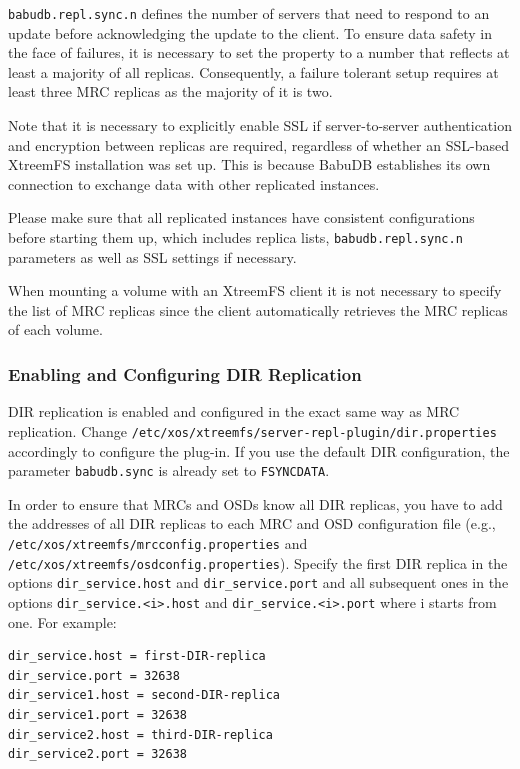 \documentclass[a4paper,10pt]{book}
\begin{document}
\texttt{babudb.repl.sync.n} defines the number of servers that need to respond to an update before acknowledging the update to the client. To ensure data safety in the face of failures, it is necessary to set the property to a number that reflects at least a majority of all replicas. Consequently, a failure tolerant setup requires at least three MRC replicas as the majority of it is two.

Note that it is necessary to explicitly enable SSL if server-to-server authentication and encryption between replicas are required, regardless of whether an SSL-based XtreemFS installation was set up. This is because BabuDB establishes its own connection to exchange data with other replicated instances.

Please make sure that all replicated instances have consistent configurations before starting them up, which includes replica lists, \texttt{babudb.repl.sync.n} parameters as well as SSL settings if necessary.

When mounting a volume with an XtreemFS client it is not necessary to specify the list of MRC replicas since the client automatically retrieves the MRC replicas of each volume.

\subsubsection{Enabling and Configuring DIR Replication}
DIR replication is enabled and configured in the exact same way as MRC replication. Change \texttt{/etc/xos/xtreemfs/server-repl-plugin/dir.properties} accordingly to configure the plug-in. If you use the default DIR configuration, the parameter \texttt{babudb.sync} is already set to \texttt{FSYNCDATA}.

In order to ensure that MRCs and OSDs know all DIR replicas, you have to add the addresses of all DIR replicas to each MRC and OSD configuration file (e.g.,  \texttt{/etc/xos/xtreemfs/mrcconfig.properties} and \texttt{/etc/xos/xtreemfs/osdconfig.properties}). Specify the first DIR replica in the options \texttt{dir\_service.host} and \texttt{dir\_service.port} and all subsequent ones in the options \texttt{dir\_service.<i>.host} and \texttt{dir\_service.<i>.port} where i starts from one. For example:

\begin{verbatim}
dir_service.host = first-DIR-replica
dir_service.port = 32638
dir_service1.host = second-DIR-replica
dir_service1.port = 32638
dir_service2.host = third-DIR-replica
dir_service2.port = 32638
\end{verbatim}
\end{document}
